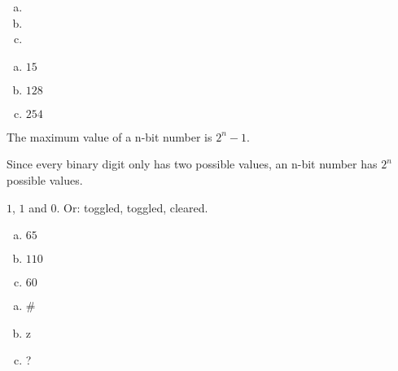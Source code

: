 \answers{}

\begin{Answer}[ref={n-to-bin}]
  \begin{enumerate}[(a)]
  \item {}
  \item {}
  \item {}
  \end{enumerate}
\end{Answer}

\begin{Answer}[ref={bin-to-n}]
  \begin{enumerate}[(a)]
  \item $15$
  \item $128$
  \item $254$
  \end{enumerate}
\end{Answer}

\begin{Answer}[ref={n-bits-max-val}]
  The maximum value of a n-bit number is $2^n - 1$.

  Since every binary digit only has two possible values, an n-bit
  number has $2^n$ possible values.
\end{Answer}

\begin{Answer}[ref={bits-value-order}]
  $1$, $1$ and $0$. Or: toggled, toggled, cleared.

\end{Answer}

\begin{Answer}[ref={ascii-to-num}]

  \begin{enumerate}[(a)]
  \item $65$
  \item $110$
  \item $60$
  \end{enumerate}

\end{Answer}

\begin{Answer}[ref={num-to-ascii}]

  \begin{enumerate}[(a)]
  \item \#
  \item z
  \item ?
  \end{enumerate}

\end{Answer}

